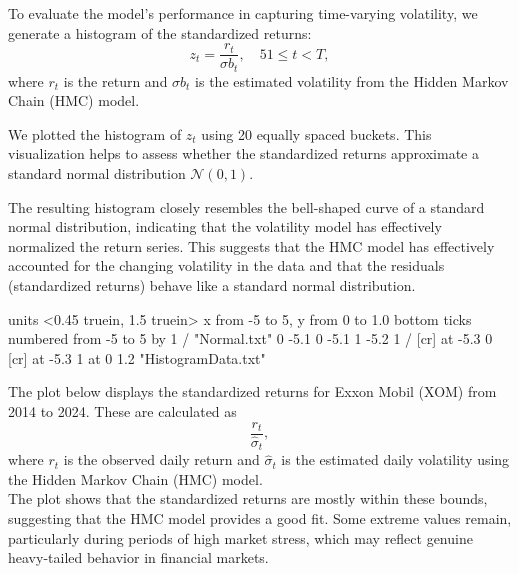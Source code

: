\documentclass{report}
\begin{document}
\newpage






To evaluate the model’s performance in capturing time-varying volatility, we generate a histogram of the standardized returns:
\[
z_t = \frac{r_t}{\sigma b_t}, \quad 51 \leq t < T,
\]
where $r_t$ is the return and $\sigma b_t$ is the estimated volatility from the Hidden Markov Chain (HMC) model.

We plotted the histogram of $z_t$ using 20 equally spaced buckets. This visualization helps to assess whether the standardized returns approximate a standard normal distribution $\mathcal{N}(0,1)$.

The resulting histogram closely resembles the bell-shaped curve of a standard normal distribution, indicating that the volatility model has effectively normalized the return series. This suggests that the HMC model has effectively accounted for the changing volatility in the data and that the residuals (standardized returns) behave like a standard normal distribution.



\begin {center}
\beginpicture
\setcoordinatesystem units <0.45 truein, 1.5 truein>
\setplotarea x from -5 to 5, y from  0 to 1.0
\axis bottom
ticks numbered from -5 to 5 by 1
/
\plot "Normal.txt"
 0 -5.1 0 -5.1 1  -5.2 1 /
 [cr] at -5.3 0
 [cr] at -5.3 1
 at 0 1.2
\sethistograms
\plot "HistogramData.txt"
\endpicture\vfill\end{center}
\newpage





The plot below displays the standardized returns for Exxon Mobil (XOM) from 2014 to 2024. These are calculated as
\[
\frac{r_t}{\hat{\sigma}_t},
\]
where $r_t$ is the observed daily return and $\hat{\sigma}_t$ is the estimated daily volatility using the Hidden Markov Chain (HMC) model. \\

The plot shows that the standardized returns are mostly within these bounds, suggesting that the HMC model provides a good fit. Some extreme values remain, particularly during periods of high market stress, which may reflect genuine heavy-tailed behavior in financial markets. \\
\end{document}
